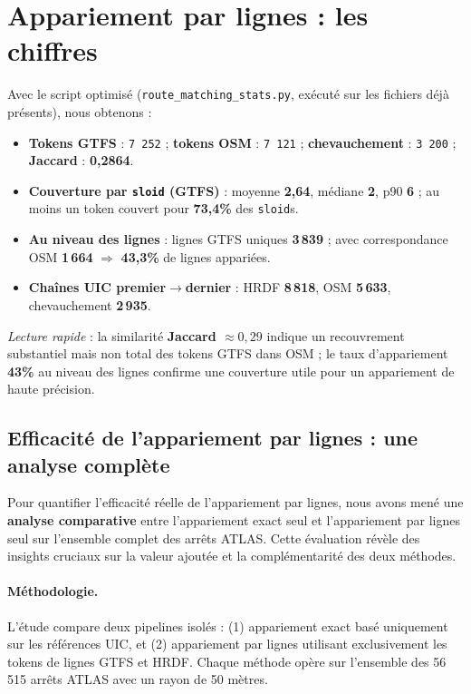 \section{Appariement par lignes : les chiffres}
Avec le script optimisé (\texttt{route\_matching\_stats.py}, exécuté sur les fichiers déjà présents), nous obtenons :
\begin{itemize}
  \item \textbf{Tokens GTFS} : \texttt{7\,252} ; \textbf{tokens OSM} : \texttt{7\,121} ; \textbf{chevauchement} : \texttt{3\,200} ; \textbf{Jaccard} : \textbf{0,2864}.
  \item \textbf{Couverture par \texttt{sloid} (GTFS)} : moyenne \textbf{2,64}, médiane \textbf{2}, p90 \textbf{6} ; au moins un token couvert pour \textbf{73,4\%} des \texttt{sloid}s.
  \item \textbf{Au niveau des lignes} : lignes GTFS uniques \textbf{3\,839} ; avec correspondance OSM \textbf{1\,664} $\Rightarrow$ \textbf{43,3\%} de lignes appariées.
  \item \textbf{Chaînes UIC premier$\rightarrow$dernier} : HRDF \textbf{8\,818}, OSM \textbf{5\,633}, chevauchement \textbf{2\,935}.
\end{itemize}
\noindent \emph{Lecture rapide} : la similarité \textbf{Jaccard $\approx 0{,}29$} indique un recouvrement substantiel mais non total des tokens GTFS dans OSM ; le taux d'appariement \textbf{43\%} au niveau des lignes confirme une couverture utile pour un appariement de haute précision.

\subsection{Efficacité de l'appariement par lignes : une analyse complète}
Pour quantifier l'efficacité réelle de l'appariement par lignes, nous avons mené une \textbf{analyse comparative} entre l'appariement exact seul et l'appariement par lignes seul sur l'ensemble complet des arrêts ATLAS. Cette évaluation révèle des insights cruciaux sur la valeur ajoutée et la complémentarité des deux méthodes.

\paragraph{Méthodologie.} L'étude compare deux pipelines isolés : (1) appariement exact basé uniquement sur les références UIC, et (2) appariement par lignes utilisant exclusivement les tokens de lignes GTFS et HRDF. Chaque méthode opère sur l'ensemble des 56\,515 arrêts ATLAS avec un rayon de 50 mètres.

